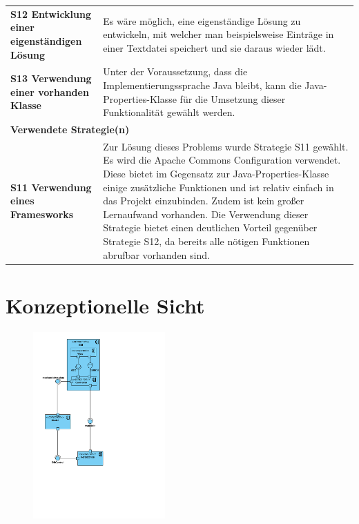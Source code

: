 \documentclass[fontsize=12pt,paper=a4,twoside]{scrartcl}
\begin{document}
\begin{tabularx}{\textwidth}{|p{6cm}|X|}
\hline
\textbf{S12 Entwicklung einer eigenständigen Lösung} & Es wäre möglich, eine eigenständige Lösung zu entwickeln, mit welcher man beispielsweise Einträge in einer Textdatei speichert und sie daraus wieder lädt. \\
\textbf{S13 Verwendung einer vorhanden Klasse} & Unter der Voraussetzung, dass die Implementierungssprache Java bleibt, kann die Java-Properties-Klasse für die Umsetzung dieser Funktionalität gewählt werden. \\\hline
\multicolumn{2}{|l|}{\textbf{Verwendete Strategie(n)}} \\\hline
\textbf{S11 Verwendung eines Framesworks} & Zur Lösung dieses Problems wurde Strategie S11 gewählt. Es wird die Apache Commons Configuration verwendet. Diese bietet im Gegensatz zur Java-Properties-Klasse einige zusätzliche Funktionen und ist relativ einfach in das Projekt einzubinden. Zudem ist kein großer Lernaufwand vorhanden. Die Verwendung dieser Strategie bietet einen deutlichen Vorteil gegenüber Strategie S12, da bereits alle nötigen Funktionen abrufbar vorhanden sind.\\\hline
\end{tabularx}
\newpage


\section{Konzeptionelle Sicht}
\label{sec:konzeptionell}

\begin{figure}[H]
\centering
\includegraphics[width=0.45\textwidth]{konzeptsicht.pdf}
\end{figure}
\end{document}
